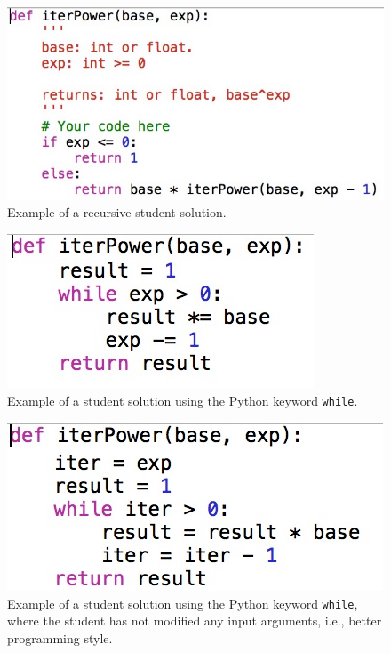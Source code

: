 \begin{figure}[ht]
\includegraphics[width=0.75\columnwidth]{Body/figures/grovercode/recursive_example}
\caption{Example of a recursive student solution.}
\label{recursive_example}
\end{figure}
\begin{figure}[ht]
\includegraphics[width=0.45\columnwidth]{Body/figures/grovercode/whilestandard}
\caption{Example of a student solution using the Python keyword \texttt{while}.}
\label{whilestandard}
\end{figure}
\begin{figure}[ht]
\includegraphics[width=0.5\columnwidth]{Body/figures/grovercode/augmentedwhile}
\caption{Example of a student solution using the Python keyword \texttt{while}, where the student has not modified any input arguments, i.e., better programming style.}
\label{augmentedwhile}
\end{figure} 

